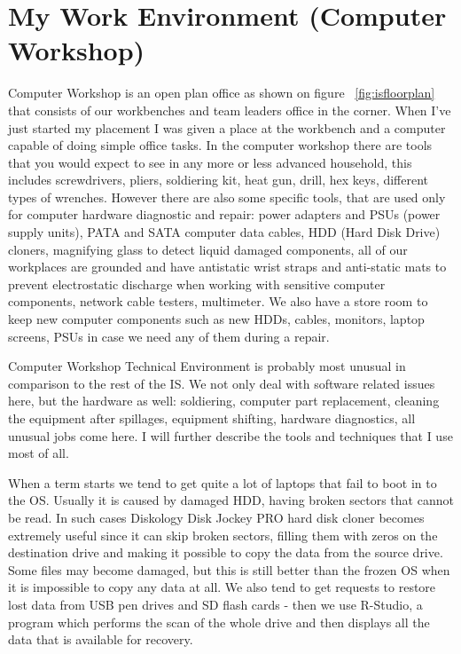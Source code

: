 \documentclass[10pt,a4paper,headinclude=true,twoside]{report}
\begin{document}
\section{My Work Environment (Computer Workshop)}
Computer Workshop is an open plan office as shown on figure ~\ref{fig:isfloorplan} that consists of our workbenches and team leaders office in the corner. When I've just started my placement I was given a place at the workbench and a computer capable of doing simple office tasks. In the computer workshop there are tools that you would expect to see in any more or less advanced household, this includes screwdrivers, pliers, soldiering kit, heat gun, drill, hex keys, different types of wrenches. However there are also some specific tools, that are used only for computer hardware diagnostic and repair: power adapters and PSUs (power supply units), PATA and SATA computer data cables, HDD (Hard Disk Drive) cloners, magnifying glass to detect liquid damaged components, all of our workplaces are grounded and have antistatic wrist straps and anti-static mats to prevent electrostatic discharge when working with sensitive computer components, network cable testers, multimeter. We also have a store room to keep new computer components such as new HDDs, cables, monitors, laptop screens, PSUs in case we need any of them during a repair.    

Computer Workshop Technical Environment is probably most unusual in comparison to the rest of the IS. We not only deal with software related issues here, but the hardware as well: soldiering, computer part replacement, cleaning the equipment after spillages, equipment shifting, hardware diagnostics, all unusual jobs come here. I will further describe the tools and techniques that I use most of all. 

When a term starts we tend to get quite a lot of laptops that fail to boot in to the OS. Usually it is caused by damaged HDD, having broken sectors that cannot be read. In such cases Diskology Disk Jockey PRO hard disk cloner\cite{DiskCloner} becomes extremely useful since it can skip broken sectors, filling them with zeros on the destination drive and making it possible to copy the data from the source drive. Some files may become damaged, but this is still better than the frozen OS when it is impossible to copy any data at all. We also tend to get requests to restore lost data from USB pen drives and SD flash cards - then we use R-Studio, a program which performs the scan of the whole drive and then displays all the data that is available for recovery. 
\end{document}
